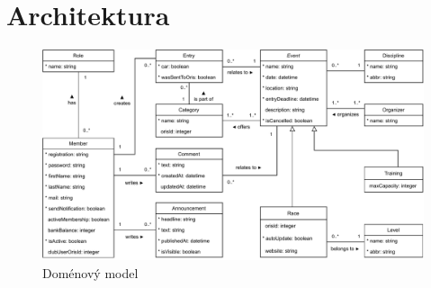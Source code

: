\section{Architektura}

\begin{landscape}
	\begin{figure}[h]
		\caption{Doménový model}
		\label{figure:domain-model}
		\centering
		\includegraphics[width=0.95\linewidth]{images/domain-model}
	\end{figure}
\end{landscape}
